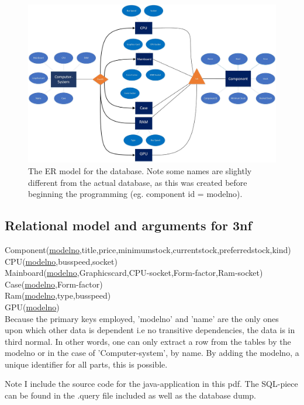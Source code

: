 \documentclass[a4paper,10pt]{article}
\begin{document}
%
%

\begin{figure}[H]\center
	\includegraphics[scale=0.4]{E_R.jpg}
	\caption{The ER model for the database. Note some names are slightly different from the actual database, as this was created before beginning the programming (eg. component id = modelno).}
\end{figure}

\subsection{Relational model and arguments for 3nf}
Component(\underline{modelno},title,price,minimumstock,currentstock,preferredstock,kind)\\
CPU(\underline{modelno},busspeed,socket)\\
Mainboard(\underline{modelno},Graphicscard,CPU-socket,Form-factor,Ram-socket)\\
Case(\underline{modelno},Form-factor)\\
Ram(\underline{modelno},type,busspeed)\\
GPU(\underline{modelno})\\
Because the primary keys employed, 'modelno' and 'name' are the only ones upon which other data is dependent i.e no transitive dependencies, the data is in third normal. In other words, one can only extract a row from the tables by the modelno or in the case of 'Computer-system', by name. By adding the modelno, a unique identifier for all parts, this is possible.

Note I include the source code for the java-application in this pdf. The SQL-piece can be found in the .query file included as well as the database dump.

\end{document}
